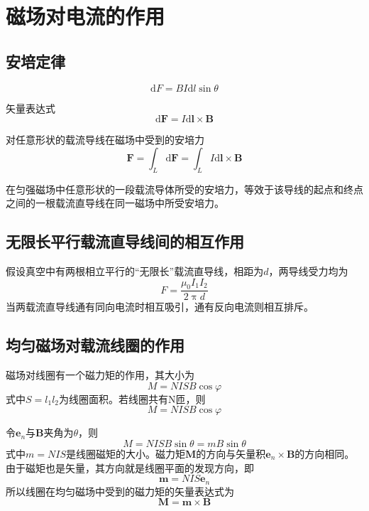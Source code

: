 \documentclass[12pt]{article}
\newcommand{\rmd}{\mathrm{d}}
\begin{document}
\section{磁场对电流的作用}

\subsection{安培定律}

\begin{equation}
    \rmd F = B I \rmd l \sin \theta
\end{equation}

矢量表达式
\begin{equation}
    \rmd \boldsymbol{F} = I \rmd \boldsymbol{l} \times \boldsymbol{B}
\end{equation}

对任意形状的载流导线在磁场中受到的安培力
\begin{equation}
    \boldsymbol{F} = \int_L \rmd \boldsymbol{F} = \int_L I \rmd \boldsymbol{l} \times \boldsymbol{B}
\end{equation}

在匀强磁场中任意形状的一段载流导体所受的安培力，等效于该导线的起点和终点之间的一根载流直导线在同一磁场中所受安培力。

\subsection{无限长平行载流直导线间的相互作用}

假设真空中有两根相立平行的“无限长”载流直导线，相距为$d$，两导线受力均为
\begin{equation}
    F = \frac{\mu_0 I_1 I_2}{2 \uppi d}
\end{equation}
当两载流直导线通有同向电流时相互吸引，通有反向电流则相互排斥。

\subsection{均匀磁场对载流线圈的作用}

磁场对线圈有一个磁力矩的作用，其大小为
\begin{equation*}
    M = NISB \cos \varphi
\end{equation*}
式中\(S = l_1l_2\)为线圈面积。若线圈共有N匝，则
\begin{equation}
    M = NISB \cos \varphi
\end{equation}

令\(\boldsymbol{e}_n\)与\(\boldsymbol{B}\)夹角为\(\theta\)，则
\begin{equation}
    M = NISB \sin \theta = m B \sin \theta
\end{equation}
式中\(m = NIS\)是线圈磁矩的大小。磁力矩\(\boldsymbol{M}\)的方向与矢量积\(\boldsymbol{e}_n \times \boldsymbol{B}\)的方向相同。由于磁矩也是矢量，其方向就是线圈平面的发现方向，即
\begin{equation}
    \boldsymbol{m} = NIS \boldsymbol{e}_n
\end{equation}
所以线圈在均匀磁场中受到的磁力矩的矢量表达式为
\begin{equation}
    \boldsymbol{M} = \boldsymbol{m} \times \boldsymbol{B}
\end{equation}
\end{document}
